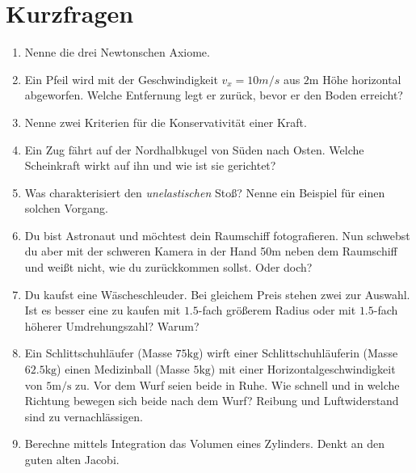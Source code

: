 \section{Kurzfragen}
\begin{enumerate}

  \item Nenne die drei Newtonschen Axiome.
  \item Ein Pfeil wird mit der Geschwindigkeit $v_x = 10 m/s$ aus $2\si{\meter}$ Höhe horizontal abgeworfen. Welche
        Entfernung legt er zurück, bevor er den Boden erreicht?
  \item Nenne zwei Kriterien für die Konservativität einer Kraft.
  \item Ein Zug fährt auf der Nordhalbkugel von Süden nach Osten. Welche Scheinkraft wirkt auf ihn und wie ist sie gerichtet?
  \item Was charakterisiert den \emph{unelastischen} Stoß? Nenne ein Beispiel für einen solchen Vorgang.
  \item Du bist Astronaut und möchtest dein Raumschiff fotografieren. Nun schwebst du aber mit der schweren Kamera in der Hand 50m
        neben dem Raumschiff und weißt nicht, wie du zurückkommen sollst. Oder doch?
  \item Du kaufst eine Wäscheschleuder. Bei gleichem Preis stehen zwei zur Auswahl.  Ist es besser eine zu kaufen mit $1.5$-fach
        größerem Radius oder mit $1.5$-fach höherer Umdrehungszahl? Warum?
  \item Ein Schlittschuhläufer (Masse $75\si{\kilo\gram}$) wirft einer Schlittschuhläuferin (Masse $62.5\si{\kilo\gram}$) einen
        Medizinball (Masse $5\si{\kilo\gram}$) mit einer Horizontalgeschwindigkeit von $5\si{\meter\per\second}$ zu. Vor dem Wurf
        seien beide in Ruhe. Wie schnell und in welche Richtung bewegen sich beide nach dem Wurf? Reibung und Luftwiderstand sind
        zu vernachlässigen.
  \item Berechne mittels Integration das Volumen eines Zylinders. Denkt an den guten alten Jacobi.
\end{enumerate}

\newpage
